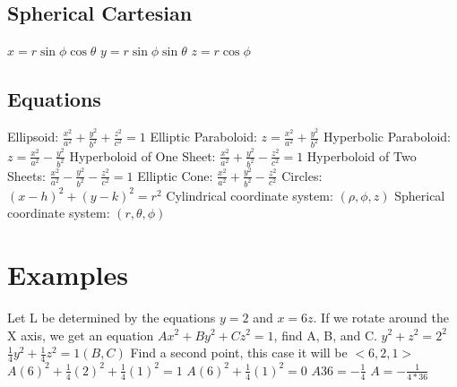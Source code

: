 \documentclass[12pt]{article}
\begin{document}
\begin{paracol}{2}
        \subsection*{Spherical \guillemotright Cartesian}
        $x = r \sin\phi \cos \theta$ \newline
        $y = r \sin\phi \sin \theta$    \newline
        $z = r \cos\phi$    \newline

        \subsection*{Equations}
        \begin{fleqn}
            Ellipsoid: $\frac{x^2}{a^2} + \frac{y^2}{b^2} + \frac{z^2}{c^2} = 1 $ \newline
            Elliptic Paraboloid: $z=\frac{x^2}{a^2}+\frac{y^2}{b^2}$ \newline
            Hyperbolic Paraboloid: $z=\frac{x^2}{a^2}-\frac{y^2}{b^2}$ \newline
            Hyperboloid of One Sheet: $\frac{x^2}{a^2} + \frac{y^2}{b^2} - \frac{z^2}{c^2} = 1 $ \newline
            Hyperboloid of Two Sheets: $\frac{x^2}{a^2} - \frac{y^2}{b^2} - \frac{z^2}{c^2} = 1 $ \newline
            Elliptic Cone: $\frac{x^2}{a^2}+\frac{y^2}{b^2}-\frac{z^2}{c^2}$ \newline
            Circles: $(x-h)^2 + (y-k)^2 = r^2$ \newline
            Cylindrical coordinate system: $(\rho,\phi,z)$ \newline
            Spherical coordinate system: $(r,\theta,\phi)$

        \end{fleqn}
        \section*{Examples}
        \begin{fleqn}
            Let L be determined by the equations $y=2$ and $x=6z$. If we rotate around the X axis, we get an equation
            \newline
            $Ax^2 + By^2 + Cz^2 = 1$, find A, B, and C.\newline
            $y^2 + z^2 = 2^2$ \newline
            $\frac{1}{4}y^2 + \frac{1}{4}z^2 = 1  (B,C)$ \newline
            Find a second point, this case it will be $<6,2,1>$ \newline
            $A(6)^2 + \frac{1}{4}(2)^2 + \frac{1}{4}(1)^2 = 1$ \newline
            $A(6)^2 + \frac{1}{4}(1)^2 = 0$ \newline
            $A36 = - \frac{1}{4}$ \newline
            $A = - \frac{1}{4*36}$ \newline
        \end{fleqn}


\end{paracol}
\end{document}
